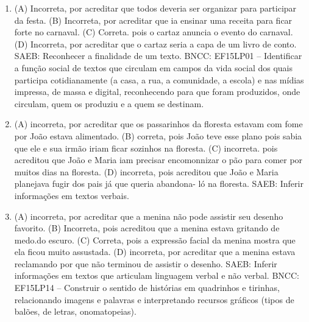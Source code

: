 \begin{enumerate}
\item
(A) Incorreta, por acreditar que todos deveria ser organizar para
participar da festa.
(B) Incorreta, por acreditar que ia ensinar uma receita para ficar
forte no carnaval.
(C) Correta. pois o cartaz anuncia o evento do carnaval.
(D) Incorreta, por acreditar que o cartaz seria a capa de um livro de
conto.
SAEB: Reconhecer a finalidade de um texto.
BNCC: EF15LP01 -- Identificar a função social de textos que
circulam em campos da vida social dos quais participa cotidianamente (a
casa, a rua, a comunidade, a escola) e nas mídias impressa, de massa e
digital, reconhecendo para que foram produzidos, onde circulam, quem os
produziu e a quem se destinam.

\item
(A) incorreta, por acreditar que os passarinhos da floresta estavam com
fome por João estava alimentado.
(B) correta, pois João teve esse plano pois sabia que ele e sua irmão
iriam ficar sozinhos na floresta.
(C) incorreta. pois acreditou que João e Maria iam precisar encomonnizar
o pão para comer por muitos dias na floresta.
(D) incorreta, pois acreditou que João e Maria planejava fugir dos pais
já que queria abandona- ló na floresta.
SAEB: Inferir informações em textos verbais.

\item
(A) incorreta, por acreditar que a menina não pode assistir seu desenho
favorito.
(B) Incorreta, pois acreditou que a menina estava gritando de medo.do
escuro.
(C) Correta, pois a expressão facial da menina mostra que ela ficou
muito assustada.
(D) incorreta, por acreditar que a menina estava reclamando por que não
terminou de assistir o desenho.
SAEB: Inferir informações em textos que articulam linguagem
verbal e não verbal.
BNCC: EF15LP14 -- Construir o sentido de histórias em
quadrinhos e tirinhas, relacionando imagens e palavras e interpretando
recursos gráficos (tipos de balões, de letras, onomatopeias).
\end{enumerate}


